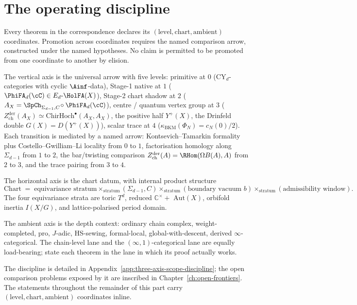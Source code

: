 \chapter{The operating discipline}
\label{ch:operating-discipline}

Every theorem in the correspondence declares its $(\text{level},
\text{chart}, \text{ambient})$ coordinates. Promotion across coordinates
requires the named comparison arrow, constructed under the named
hypotheses. No claim is permitted to be promoted from one coordinate to
another by elision.

The vertical axis is the universal arrow with five levels:
primitive at $0$ ($\mathrm{CY}_d$-categories with cyclic $\Ainf$-data),
Stage-1 native at $1$
($\PhiFA_d(\cC) \in E_d\text{-}\HolFA(X)$),
Stage-2 chart shadow at $2$
($A_X = \SpCh_{\Sigma_{d-1}, C} \!\circ \PhiFA_d(\cC)$),
centre / quantum vertex group at $3$
($Z^{\mathrm{der}}_{\mathrm{ch}}(A_X) \simeq \mathrm{ChirHoch}^\bullet(A_X, A_X)$,
the positive half $Y^+(X)$, the Drinfeld double $G(X) = D(Y^+(X))$),
scalar trace at $4$
($\kappa_{\mathrm{BKM}}(\Phi_N) = c_N(0)/2$).
Each transition is mediated by a named arrow:
Kontsevich--Tamarkin formality plus
Costello--Gwilliam--Li locality from $0$ to $1$, factorisation
homology along $\Sigma_{d-1}$ from $1$ to $2$, the bar/twisting
comparison $Z^{\mathrm{der}}_{\mathrm{ch}}(A) = \RHom(\Omega B(A), A)$
from $2$ to $3$, and the trace pairing from $3$ to $4$.

The horizontal axis is the chart datum, with internal product structure
\[
\text{Chart} \;=\; \text{equivariance stratum}
  \times_{\text{stratum}} (\Sigma_{d-1}, C)
  \times_{\text{stratum}} (\text{boundary vacuum } b)
  \times_{\text{stratum}} (\text{admissibility window}).
\]
The four equivariance strata are toric $T^d$, reduced
$\mathbb{C}^\times +$ $\mathrm{Aut}(X)$, orbifold inertia $I(X/G)$,
and lattice-polarised period domain.

The ambient axis is the depth context: ordinary chain complex,
weight-completed, pro, $J$-adic, HS-sewing, formal-local,
global-with-descent, derived $\infty$-categorical. The chain-level lane
and the $(\infty, 1)$-categorical lane are equally load-bearing; state
each theorem in the lane in which its proof actually works.

The discipline is detailed in
Appendix~\ref{app:three-axis-scope-discipline}; the open comparison
problems exposed by it are inscribed in
Chapter~\ref{ch:open-frontiers}. The statements throughout the
remainder of this part carry $(\text{level}, \text{chart},
\text{ambient})$ coordinates inline.
